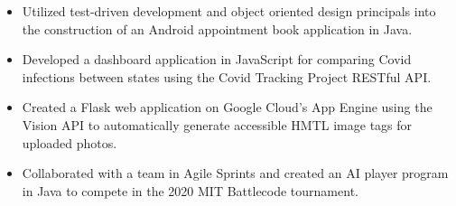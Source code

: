 \documentclass[11pt]{article}
\begin{document}
\begin{itemize}[leftmargin=*, itemsep=0pt, topsep=5pt]
	\item Utilized test-driven development and object oriented design principals into the construction of an Android appointment book application in Java.
	\item Developed a dashboard application in JavaScript for comparing Covid infections between states using the Covid Tracking Project RESTful API.
	\item Created a Flask web application on Google Cloud’s App Engine using the Vision API to automatically generate accessible HMTL image tags for uploaded photos.
	\item Collaborated with a team in Agile Sprints and created an AI player program in Java to compete in the 2020 MIT Battlecode tournament.
\end{itemize} 
\smallskip
\end{document}
